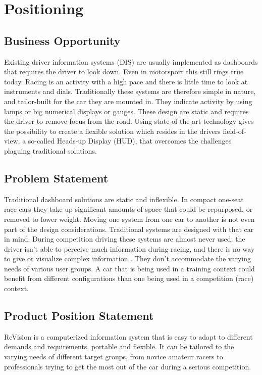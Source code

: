 \section{Positioning}

\subsection{Business Opportunity}
Existing driver information systems (DIS) are usually implemented as dashboards
that requires the driver to look down. Even in motorsport this still rings true
today. Racing is an activity with a high pace and there is little time to look
at instruments and dials. Traditionally these systems are therefore simple in nature, and
tailor-built for the car they are mounted in. They indicate activity by using
lamps or big numerical displays or gauges. These design are static and requires
the driver to remove focus from the road. Using state-of-the-art technology
gives the possibility to create a flexible solution which resides in the
drivers field-of-view, a so-called Heads-up Display (HUD), that overcomes the
challenges plaguing traditional solutions. 

\subsection{Problem Statement}
Traditional dashboard solutions are static and inflexible. In compact one-seat race cars they take up significant amounts of space that could be
repurposed, or removed to lower weight. Moving one system from one car to another is not even part of the
design considerations. Traditional systems are designed with that car in mind.
During competition driving these systems are almost never used; the driver
isn't able to perceive much information during racing, and there is no way to
give or visualize complex information \cite[Appendix A]{kranebae:fordypning}
. They don't accommodate the varying needs
of various user groups. A car that is being used in a training context could 
benefit from different configurations than one being used in a competition 
(race) context. 

\subsection{Product Position Statement}
ReVision is a computerized information system that is easy to adapt to
different demands and requirements, portable and flexible. It can be tailored
to the varying needs of different target groups, from novice amateur
racers to professionals trying to get the most out of the car during a serious
competition.


